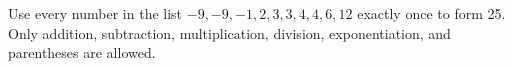Use every number in the list $-9,-9,-1,2,3,3,4,4,6,12$ exactly once to form 25. Only addition, subtraction, multiplication, division, exponentiation, and parentheses are allowed.
